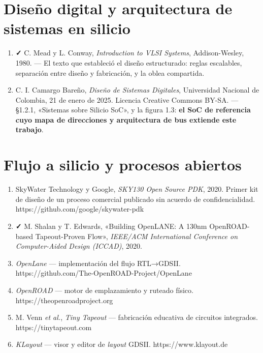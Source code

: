 \section{Diseño digital y arquitectura de sistemas en
silicio}\label{diseuxf1o-digital-y-arquitectura-de-sistemas-en-silicio}

\begin{enumerate}
\def\labelenumi{\arabic{enumi}.}
\setcounter{enumi}{13}
\tightlist
\item
  \textbf{✓} C. Mead y L. Conway, \emph{Introduction to VLSI Systems},
  Addison-Wesley, 1980. --- El texto que estableció el diseño
  estructurado: reglas escalables, separación entre diseño y
  fabricación, y la oblea compartida.
\item
  C. I. Camargo Bareño, \emph{Diseño de Sistemas Digitales}, Universidad
  Nacional de Colombia, 21 de enero de 2025. Licencia Creative Commons
  BY-SA. --- §1.2.1, «Sistemas sobre Silicio SoC», y la figura 1.3:
  \textbf{el SoC de referencia cuyo mapa de direcciones y arquitectura
  de bus extiende este trabajo}.
\end{enumerate}

\section{Flujo a silicio y procesos
abiertos}\label{flujo-a-silicio-y-procesos-abiertos}

\begin{enumerate}
\def\labelenumi{\arabic{enumi}.}
\setcounter{enumi}{15}
\tightlist
\item
  SkyWater Technology y Google, \emph{SKY130 Open Source PDK}, 2020.
  Primer kit de diseño de un proceso comercial publicado sin acuerdo de
  confidencialidad. https://github.com/google/skywater-pdk
\item
  \textbf{✓} M. Shalan y T. Edwards, «Building OpenLANE: A 130nm
  OpenROAD-based Tapeout-Proven Flow», \emph{IEEE/ACM International
  Conference on Computer-Aided Design (ICCAD)}, 2020.
\item
  \emph{OpenLane} --- implementación del flujo RTL→GDSII.
  https://github.com/The-OpenROAD-Project/OpenLane
\item
  \emph{OpenROAD} --- motor de emplazamiento y ruteado físico.
  https://theopenroadproject.org
\item
  M. Venn \emph{et al.}, \emph{Tiny Tapeout} --- fabricación educativa
  de circuitos integrados. https://tinytapeout.com
\item
  \emph{KLayout} --- visor y editor de \emph{layout} GDSII.
  https://www.klayout.de
\end{enumerate}

